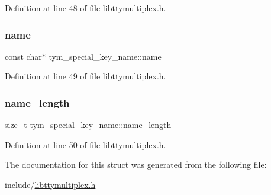 Definition at line 48 of file libttymultiplex.\+h.

\mbox{\label{structtym__special__key__name_a9a82b9fd28fae482c836f959ca5a848b}} 
\subsubsection{\texorpdfstring{name}{name}}
{\footnotesize\ttfamily const char$\ast$ tym\+\_\+special\+\_\+key\+\_\+name\+::name}



Definition at line 49 of file libttymultiplex.\+h.

\mbox{\label{structtym__special__key__name_a6d6587d1d107252a68c6d9ab753d3ea6}} 
\subsubsection{\texorpdfstring{name\+\_\+length}{name\_length}}
{\footnotesize\ttfamily size\+\_\+t tym\+\_\+special\+\_\+key\+\_\+name\+::name\+\_\+length}



Definition at line 50 of file libttymultiplex.\+h.



The documentation for this struct was generated from the following file\+:\begin{DoxyCompactItemize}
\item 
include/\hyperlink{libttymultiplex_8h}{libttymultiplex.\+h}\end{DoxyCompactItemize}
